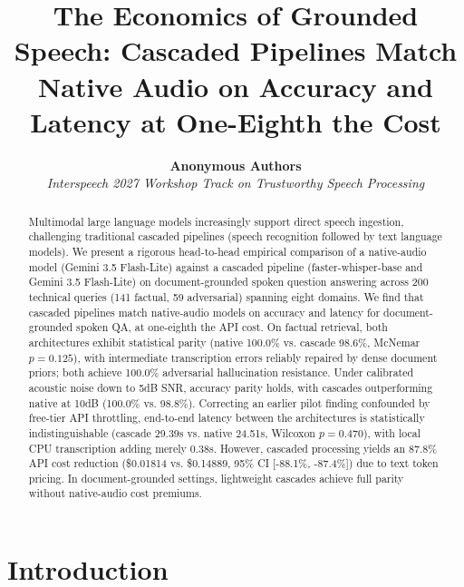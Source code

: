 \documentclass[10pt,a4paper,twocolumn]{article}
\title{\textbf{The Economics of Grounded Speech: Cascaded Pipelines Match Native Audio on Accuracy and Latency at One-Eighth the Cost}}
\author{
  \textbf{Anonymous Authors}\\
  \textit{Interspeech 2027 Workshop Track on Trustworthy Speech Processing}
}
\date{}
\begin{document}
\maketitle
\thispagestyle{empty}

\begin{abstract}
Multimodal large language models increasingly support direct speech ingestion, challenging traditional cascaded pipelines (speech recognition followed by text language models). We present a rigorous head-to-head empirical comparison of a native-audio model (Gemini 3.5 Flash-Lite) against a cascaded pipeline (faster-whisper-base and Gemini 3.5 Flash-Lite) on document-grounded spoken question answering across 200 technical queries (141 factual, 59 adversarial) spanning eight domains. We find that cascaded pipelines match native-audio models on accuracy and latency for document-grounded spoken QA, at one-eighth the API cost. On factual retrieval, both architectures exhibit statistical parity (native 100.0\% vs. cascade 98.6\%, McNemar $p=0.125$), with intermediate transcription errors reliably repaired by dense document priors; both achieve 100.0\% adversarial hallucination resistance. Under calibrated acoustic noise down to 5dB SNR, accuracy parity holds, with cascades outperforming native at 10dB (100.0\% vs. 98.8\%). Correcting an earlier pilot finding confounded by free-tier API throttling, end-to-end latency between the architectures is statistically indistinguishable (cascade 29.39s vs. native 24.51s, Wilcoxon $p=0.470$), with local CPU transcription adding merely 0.38s. However, cascaded processing yields an 87.8\% API cost reduction (\$0.01814 vs. \$0.14889, 95\% CI [-88.1\%, -87.4\%]) due to text token pricing. In document-grounded settings, lightweight cascades achieve full parity without native-audio cost premiums.
\end{abstract}

\section{Introduction}
\label{sec:intro}
\end{document}
